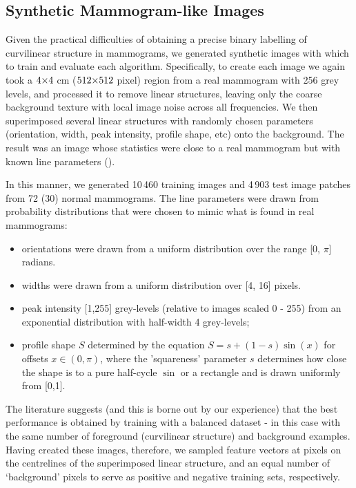 \subsection{Synthetic Mammogram-like Images}
Given the practical difficulties of obtaining a precise binary labelling of curvilinear structure in mammograms, we generated synthetic images with which to train and evaluate each algorithm\cite{Berks_PhD10}. Specifically, to create each image we again took a $4 {\times} 4$ cm ($512 {\times} 512$ pixel) region from a real mammogram with 256 grey levels, and processed it to remove linear structures, leaving only the coarse background texture with local image noise across all frequencies. We then superimposed several linear structures with randomly chosen parameters (orientation, width, peak intensity,  profile shape, etc) onto the background. The result was an image whose statistics were close to a real mammogram but with known line parameters ().

In this manner, we generated 10\,460 training images and 4\,903 test image patches from 72 (30) normal mammograms. The line parameters were drawn from probability distributions that were chosen to mimic what is found in real mammograms:

\begin{itemize}
\item orientations were drawn from a uniform distribution over the range [0, $\pi$] radians.
\item widths were drawn from a uniform distribution over [4, 16] pixels.
\item peak intensity [1,255] grey-levels (relative to images scaled 0 - 255) from an exponential distribution with half-width 4 grey-levels; 
\item profile shape $S$ determined by the equation $S = s + (1-s) \sin(x)$ for offsets $x \in (0,\pi)$, where the 'squareness' parameter $s$ determines how close the shape is to a pure half-cycle $\sin$ or a rectangle and is drawn uniformly from [0,1]. 
\end{itemize}

The literature suggests (and this is borne out by our experience) that the best performance is obtained by training with a balanced dataset - in this case with the same number of foreground (curvilinear structure) and background examples. Having created these images, therefore, we sampled feature vectors at pixels on the centrelines of the superimposed linear structure, and an equal number of `background' pixels to serve as positive and negative training sets, respectively. 

